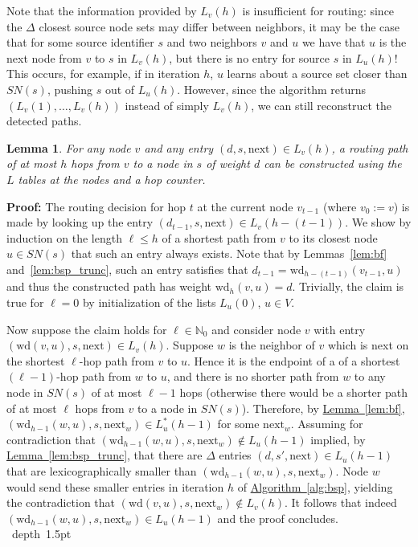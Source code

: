 \documentclass[letterpaper,11pt]{article}
\newcommand{\namedref}[2]{\hyperref[#2]{#1~\ref*{#2}}}
\newcommand{\lemmaref}[1]{\namedref{Lemma}{#1}}
\newcommand{\algref}[1]{\namedref{Algorithm}{#1}}
\newtheorem{lemma}[theorem]{Lemma}
\newcommand{\blackslug}{\hbox{\hskip 1pt \vrule width 4pt height 8pt
depth 1.5pt \hskip 1pt}}
\newcommand{\QED}{\quad\blackslug\lower 8.5pt\null\par}
\newenvironment{proof}[1][Proof:]{\noindent \textbf{#1}\xspace}{\QED}
\newcommand{\N}{\mathbb{N}}
\newcommand{\Next}{\mathrm{next}}
\newcommand{\Wd}{\mathrm{wd}}
\begin{document}
Note that the information provided by $L_v(h)$ is insufficient for routing:
since the $\Delta$ closest source node sets may differ between neighbors, it
may be the case that for some source identifier $s$ and two neighbors $v$ and
$u$ we have that $u$ is the next node from $v$ to $s$ in $L_v(h)$, but there is
no entry for source $s$ in $L_u(h)$! This occurs, for example, if in  iteration
$h$, $u$ learns about a source set closer than $SN(s)$, pushing $s$ out of
$L_u(h)$. However, since the algorithm returns $(L_v(1),\ldots,L_v(h))$ instead of
simply $L_v(h)$, we can still reconstruct the detected paths.
\begin{lemma}\label{lemma:bsp_route_stateful}
For any node $v$ and any entry $(d,s,\Next)\in L_v(h)$, a routing path of at
most $h$ hops from $v$ to a node in $s$ of weight $d$ can be constructed using
the $L$ tables at the nodes and a hop counter.
\end{lemma}
\begin{proof}
The routing decision for hop $t$ at the current node $v_{t-1}$ (where $v_0:=v$)
is made by looking up the entry $(d_{t-1},s,\Next)\in L_v(h-(t-1))$. We show by
induction on the length $\ell\leq h$ of a shortest path from $v$ to its closest
node $u\in SN(s)$ that such an entry always exists. Note that by
Lemmas~\ref{lem:bf} and~\ref{lem:bsp_trunc}, such an entry satisfies that
$d_{t-1}=\Wd_{h-(t-1)}(v_{t-1},u)$ and thus the constructed path has weight
$\Wd_h(v,u)=d$. Trivially, the claim is true for $\ell=0$ by initialization of
the lists $L_u(0)$, $u\in V$.

Now suppose the claim holds for $\ell\in \N_0$ and consider node $v$ with entry
$(\Wd(v,u),s,\Next)\in L_v(h)$. Suppose $w$ is the neighbor of $v$ which is next
on the shortest $\ell$-hop path from $v$ to $u$. Hence it is the endpoint of a
of a shortest $(\ell-1)$-hop path from $w$ to $u$, and there is no shorter path
from $w$ to any node in $SN(s)$ of at most $\ell-1$ hops (otherwise there would
be a shorter path of at most $\ell$ hops from $v$ to a node in $SN(s)$).
Therefore, by \lemmaref{lem:bf}, $(\Wd_{h-1}(w,u),s,\Next_w)\in L_u^*(h-1)$ for
some $\Next_w$. Assuming for contradiction that
$(\Wd_{h-1}(w,u),s,\Next_w)\notin L_u(h-1)$ implied, by
\lemmaref{lem:bsp_trunc}, that there are $\Delta$ entries $(d,s',\Next)\in
L_u(h-1)$ that are lexicographically smaller than $(\Wd_{h-1}(w,u),s,\Next_w)$.
Node $w$ would send these smaller entries in iteration $h$ of \algref{alg:bsp},
yielding the contradiction that $(\Wd(v,u),s,\Next_w)\notin L_v(h)$. It follows
that indeed $(\Wd_{h-1}(w,u),s,\Next_w)\in L_u(h-1)$ and the proof concludes.
\end{proof}
\end{document}
